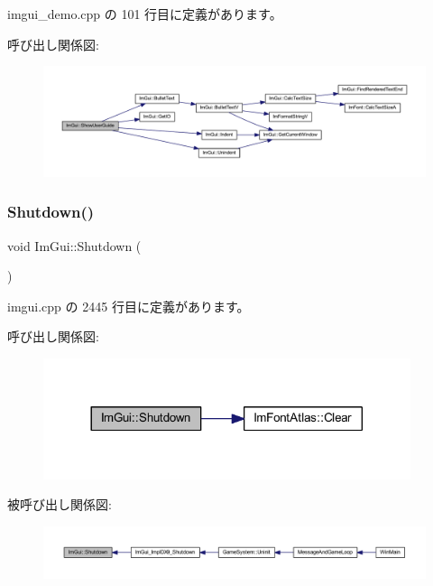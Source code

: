  imgui\+\_\+demo.\+cpp の 101 行目に定義があります。

呼び出し関係図\+:\nopagebreak
\begin{figure}[H]
\begin{center}
\leavevmode
\includegraphics[width=350pt]{namespace_im_gui_ad6f4919bc9aa806ca8d2c1d6e2bfb051_cgraph}
\end{center}
\end{figure}
\mbox{\label{namespace_im_gui_aeba34069558d4fbcf734a9c92ce3b773}} 
\subsubsection{\texorpdfstring{Shutdown()}{Shutdown()}}
{\footnotesize\ttfamily void Im\+Gui\+::\+Shutdown (\begin{DoxyParamCaption}{ }\end{DoxyParamCaption})}



 imgui.\+cpp の 2445 行目に定義があります。

呼び出し関係図\+:\nopagebreak
\begin{figure}[H]
\begin{center}
\leavevmode
\includegraphics[width=305pt]{namespace_im_gui_aeba34069558d4fbcf734a9c92ce3b773_cgraph}
\end{center}
\end{figure}
被呼び出し関係図\+:\nopagebreak
\begin{figure}[H]
\begin{center}
\leavevmode
\includegraphics[width=350pt]{namespace_im_gui_aeba34069558d4fbcf734a9c92ce3b773_icgraph}
\end{center}
\end{figure}
\mbox{\label{namespace_im_gui_ad20170a9fff4ded0076476dad8ec6645}} 
